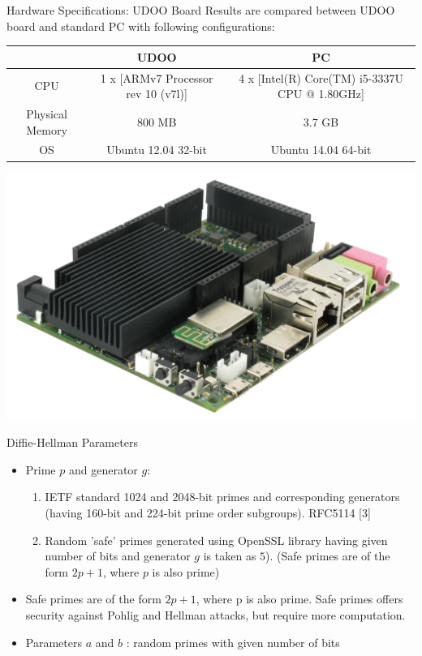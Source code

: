 \documentclass[xcolor=dvipsnames]{beamer}
\begin{document}
\begin{frame}{Hardware Specifications: UDOO Board}
Results are compared between UDOO board and standard PC with following configurations:\\
\medskip
\centering
{} {
\begin{tabular}{| c | c | c |}
\hline
& UDOO & PC\\
\hline
CPU & 1 x [ARMv7 Processor rev 10 (v7l)] &  4 x [Intel(R) Core(TM) i5-3337U CPU @ 1.80GHz]\\
\hline
Physical Memory & 800 MB & 3.7 GB\\
\hline
OS & Ubuntu 12.04 32-bit & Ubuntu 14.04 64-bit\\
\hline
\end{tabular}
}
\includegraphics[scale=0.09]{udoo}\\
\end{frame}

\begin{frame}{Diffie-Hellman Parameters}
\begin{itemize}
\item Prime $p$ and generator $g$:\\
\begin{enumerate}
\item IETF standard 1024 and 2048-bit primes and corresponding generators (having 160-bit and 224-bit prime order subgroups). RFC5114 [3]
\medskip
\item Random 'safe' primes generated using OpenSSL library having given number of bits and generator $g$ is taken as $5$). (Safe primes are of the form $2p+1$, where $p$ is also prime) 
\end{enumerate}
\item Safe primes are of the form $2p+1$, where p is also prime. Safe primes offers security against Pohlig and Hellman attacks, but require more computation.
\item Parameters $a$ and $b$ :
random primes with given number of bits
\end{itemize}
\end{frame}
\end{document}
